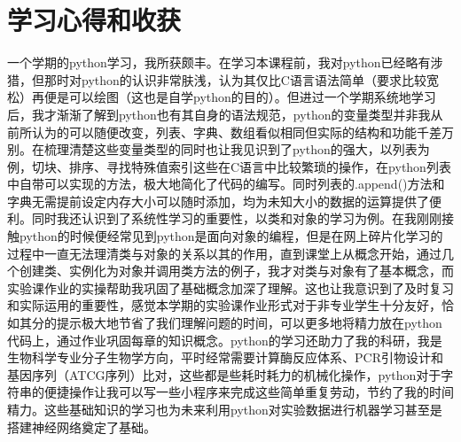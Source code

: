 \documentclass{ctexart}
\begin{document}
\section{学习心得和收获}
一个学期的python学习，我所获颇丰。在学习本课程前，我对python已经略有涉猎，但那时对python的认识非常肤浅，认为其仅比C语言语法简单（要求比较宽松）再便是可以绘图（这也是自学python的目的）。但进过一个学期系统地学习后，我才渐渐了解到python也有其自身的语法规范，python的变量类型并非我从前所认为的可以随便改变，列表、字典、数组看似相同但实际的结构和功能千差万别。在梳理清楚这些变量类型的同时也让我见识到了python的强大，以列表为例，切块、排序、寻找特殊值索引这些在C语言中比较繁琐的操作，在python列表中自带可以实现的方法，极大地简化了代码的编写。同时列表的.append()方法和字典无需提前设定内存大小可以随时添加，均为未知大小的数据的运算提供了便利。同时我还认识到了系统性学习的重要性，以类和对象的学习为例。在我刚刚接触python的时候便经常见到python是面向对象的编程，但是在网上碎片化学习的过程中一直无法理清类与对象的关系以其的作用，直到课堂上从概念开始，通过几个创建类、实例化为对象并调用类方法的例子，我才对类与对象有了基本概念，而实验课作业的实操帮助我巩固了基础概念加深了理解。这也让我意识到了及时复习和实际运用的重要性，感觉本学期的实验课作业形式对于非专业学生十分友好，恰如其分的提示极大地节省了我们理解问题的时间，可以更多地将精力放在python代码上，通过作业巩固每章的知识概念。python的学习还助力了我的科研，我是生物科学专业分子生物学方向，平时经常需要计算酶反应体系、PCR引物设计和基因序列（ATCG序列）比对，这些都是些耗时耗力的机械化操作，python对于字符串的便捷操作让我可以写一些小程序来完成这些简单重复劳动，节约了我的时间精力。这些基础知识的学习也为未来利用python对实验数据进行机器学习甚至是搭建神经网络奠定了基础。



\end{document}
